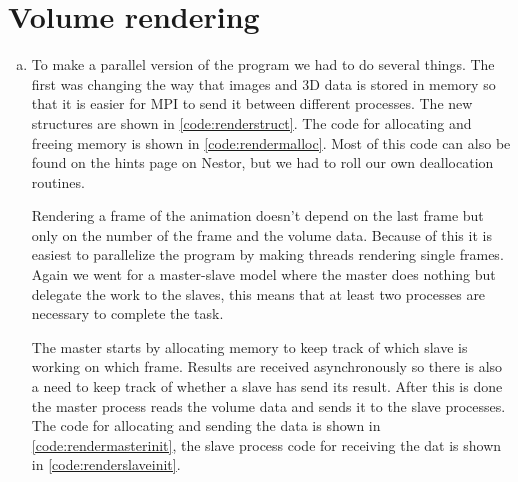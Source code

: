 \documentclass[a4paper]{article}
\begin{document}
\section{Volume rendering}
\begin{enumerate}[(a)]
	\item To make a parallel version of the program we had to do several things. The first was changing the way that images and 3D data is stored in memory so that it is easier for MPI to send it between different processes. The new structures are shown in \autoref{code:renderstruct}. The code for allocating and freeing memory is shown in \autoref{code:rendermalloc}. Most of this code can also be found on the hints page on Nestor, but we had to roll our own deallocation routines.
	
	
	
	
	Rendering a frame of the animation doesn't depend on the last frame but only on the number of the frame and the volume data. Because of this it is easiest to parallelize the program by making threads rendering single frames. Again we went for a master-slave model where the master does nothing but delegate the work to the slaves, this means that at least two processes are necessary to complete the task.
	
	The master starts by allocating memory to keep track of which slave is working on which frame. Results are received asynchronously so there is also a need to keep track of whether a slave has send its result. After this is done the master process reads the volume data and sends it to the slave processes. The code for allocating and sending the data is shown in \autoref{code:rendermasterinit}, the slave process code for receiving the dat is shown in \autoref{code:renderslaveinit}.
	
	
	
	

\end{enumerate}
\end{document}

